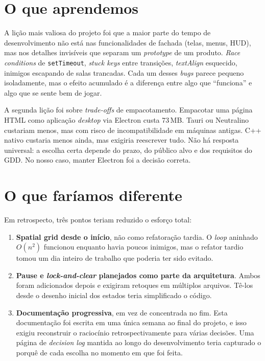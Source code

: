 \section{O que aprendemos}

A lição mais valiosa do projeto foi que a maior parte do tempo de desenvolvimento não
está nas funcionalidades de fachada (telas, menus, HUD), mas nos detalhes invisíveis
que separam um \emph{prototype} de um produto. \emph{Race conditions} de
\texttt{setTimeout}, \emph{stuck keys} entre transições, \emph{textAlign} esquecido,
inimigos escapando de salas trancadas. Cada um desses \emph{bugs} parece pequeno
isoladamente, mas o efeito acumulado é a diferença entre algo que ``funciona'' e algo
que se sente bem de jogar.

A segunda lição foi sobre \emph{trade-offs} de empacotamento. Empacotar uma página
HTML como aplicação \emph{desktop} via Electron custa 73\,MB. Tauri ou Neutralino
custariam menos, mas com risco de incompatibilidade em máquinas antigas. C++ nativo
custaria menos ainda, mas exigiria reescrever tudo. Não há resposta universal: a
escolha certa depende do prazo, do público alvo e dos requisitos do GDD. No nosso
caso, manter Electron foi a decisão correta.

\section{O que faríamos diferente}

Em retrospecto, três pontos teriam reduzido o esforço total:

\begin{enumerate}
  \item \textbf{Spatial grid desde o início}, não como refatoração tardia. O
    \emph{loop} aninhado $O(n^2)$ funcionou enquanto havia poucos inimigos, mas o
    refator tardio tomou um dia inteiro de trabalho que poderia ter sido evitado.

  \item \textbf{Pause e \emph{lock-and-clear} planejados como parte da arquitetura}.
    Ambos foram adicionados depois e exigiram retoques em múltiplos arquivos. Tê-los
    desde o desenho inicial dos estados teria simplificado o código.

  \item \textbf{Documentação progressiva}, em vez de concentrada no fim. Esta
    documentação foi escrita em uma única semana ao final do projeto, e isso exigiu
    reconstruir o raciocínio retrospectivamente para várias decisões. Uma página de
    \emph{decision log} mantida ao longo do desenvolvimento teria capturado o porquê
    de cada escolha no momento em que foi feita.
\end{enumerate}

